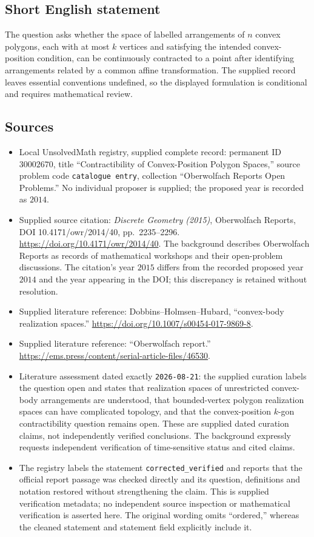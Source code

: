 \documentclass[11pt]{article}
\begin{document}
\subsection{Short English statement}
The question asks whether the space of labelled arrangements of $n$ convex polygons, each with at most $k$ vertices and satisfying the intended convex-position condition, can be continuously contracted to a point after identifying arrangements related by a common affine transformation. The supplied record leaves essential conventions undefined, so the displayed formulation is conditional and requires mathematical review.
\subsection{Sources}
\begin{itemize}
\item Local UnsolvedMath registry, supplied complete record: permanent ID $30002670$, title ``Contractibility of Convex-Position Polygon Spaces,'' source problem code \texttt{catalogue entry}, collection ``Oberwolfach Reports Open Problems.'' No individual proposer is supplied; the proposed year is recorded as $2014$.
\item Supplied source citation: \emph{Discrete Geometry (2015)}, Oberwolfach Reports, DOI 10.4171/owr/2014/40, pp.\ 2235--2296. \url{https://doi.org/10.4171/owr/2014/40}. The background describes Oberwolfach Reports as records of mathematical workshops and their open-problem discussions. The citation's year $2015$ differs from the recorded proposed year $2014$ and the year appearing in the DOI; this discrepancy is retained without resolution.
\item Supplied literature reference: Dobbins--Holmsen--Hubard, ``convex-body realization spaces.'' \url{https://doi.org/10.1007/s00454-017-9869-8}.
\item Supplied literature reference: ``Oberwolfach report.'' \url{https://ems.press/content/serial-article-files/46530}.
\item Literature assessment dated exactly \texttt{2026-08-21}: the supplied curation labels the question open and states that realization spaces of unrestricted convex-body arrangements are understood, that bounded-vertex polygon realization spaces can have complicated topology, and that the convex-position $k$-gon contractibility question remains open. These are supplied dated curation claims, not independently verified conclusions. The background expressly requests independent verification of time-sensitive status and cited claims.
\item The registry labels the statement \texttt{corrected\_verified} and reports that the official report passage was checked directly and its question, definitions and notation restored without strengthening the claim. This is supplied verification metadata; no independent source inspection or mathematical verification is asserted here. The original wording omits ``ordered,'' whereas the cleaned statement and statement field explicitly include it.
\end{itemize}
\end{document}
